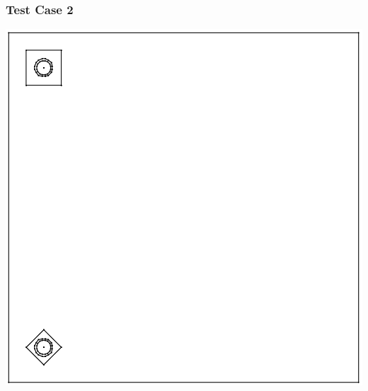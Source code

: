 \documentclass[compress]{beamer}
\begin{document}
\begin{frame}[t]\frametitle{Test Case 2}
\centering
\includegraphics[scale = 0.4]{figures/unbalanced_pins_same_side-eps-converted-to.pdf}
\end{frame}
\end{document}
